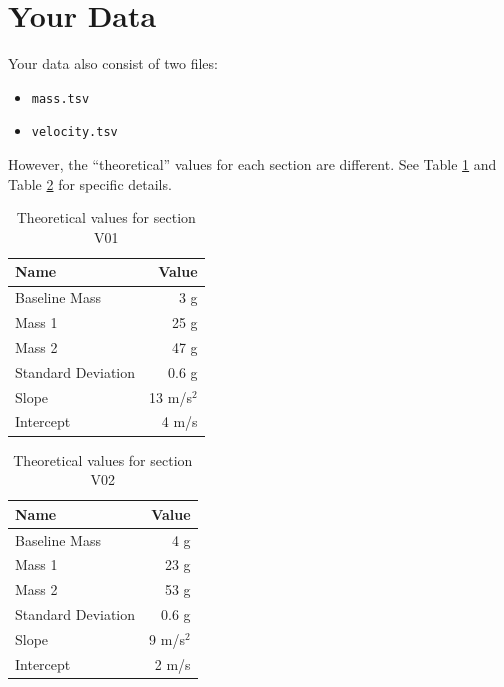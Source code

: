 \section{Your Data}
Your data also consist of two files:
\begin{itemize}
    \item \texttt{mass.tsv}
    \item \texttt{velocity.tsv}
\end{itemize}
However, the ``theoretical'' values for each section are different. See Table \ref{table.theoretical.v01} and Table \ref{table.theoretical.v02} for specific details.
\begin{table}
    \centering
    \begin{tabular}{|l|r|}
        \hline
        \textbf{Name} & \textbf{Value} \\
        \hline
        Baseline Mass & 3 g \\
        Mass 1 & 25 g \\
        Mass 2 & 47 g \\
        Standard Deviation & 0.6 g \\
        \hline
        Slope & 13 m/s$^{2}$ \\
        Intercept & 4 m/s \\
        \hline
    \end{tabular}
    \caption{Theoretical values for section V01}
    \label{table.theoretical.v01}
\end{table}
\begin{table}
    \centering
    \begin{tabular}{|l|r|}
        \hline
        \textbf{Name} & \textbf{Value} \\
        \hline
        Baseline Mass & 4 g \\
        Mass 1 & 23 g \\
        Mass 2 & 53 g \\
        Standard Deviation & 0.6 g \\
        \hline
        Slope & 9 m/s$^{2}$ \\
        Intercept & 2 m/s \\
        \hline
    \end{tabular}
    \caption{Theoretical values for section V02}
    \label{table.theoretical.v02}
\end{table}
